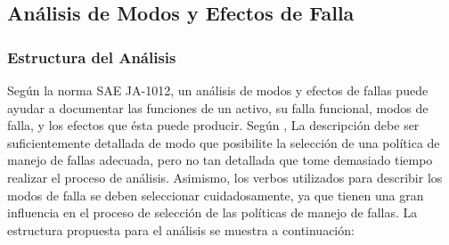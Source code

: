\subsection{Análisis de Modos y Efectos de Falla}

\subsubsection{Estructura del Análisis}

Según la norma SAE JA-1012, un análisis de modos y efectos de fallas puede ayudar a documentar las funciones de un activo, su falla funcional, modos de falla, y los efectos que ésta puede producir. Según \cite{saeja1012}, La descripción debe ser suficientemente detallada de modo que posibilite la selección de una política de manejo de fallas adecuada, pero no tan detallada que tome demasiado tiempo realizar el proceso de análisis. Asimismo, los verbos utilizados para describir los modos de falla se deben seleccionar cuidadosamente, ya que tienen una gran influencia en el proceso de selección de las políticas de manejo de fallas. La estructura propuesta para el análisis se muestra a continuación:


\begin{table}[H]
  \centering
 
    
    \caption{Estructura propuesta para hoja de Información RCM.}
  \label{tab:addlabel}%
\end{table}%

